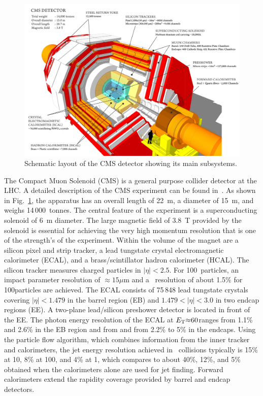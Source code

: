 \begin{figure}
\begin{center}
\includegraphics[height=0.49\textwidth]{introduction_figs/cms_120918_03.png}
\caption{Schematic layout of the CMS detector showing its main subsystems.}
\label{figs:CMSdet}
\end{center}
\end{figure}
The Compact Muon Solenoid (CMS) is a general purpose collider detector at the LHC. A detailed description of the CMS experiment
can be found in~\cite{Chatrchyan:2008zzk}.
As shown in Fig.~\ref{figs:CMSdet},  the apparatus has an overall length of 22~m, a diameter of 15~m, and weighs 14\,000~tonnes.
The central feature of the experiment is a superconducting solenoid
of 6~m diameter. The large magnetic field of 3.8~T provided by the solenoid is essential for achieving
the very high momentum resolution that is one of the strength's of the experiment.
Within the volume of the magnet are a silicon pixel and strip tracker, a lead tungstate crystal
electromagnetic calorimeter (ECAL), and a brass/scintillator hadron calorimeter (HCAL).
The silicon tracker measures charged particles in $|\eta|< 2.5$.
For 100\GeVc\ particles, an impact parameter resolution of $\approx 15\mu$m and a \pT\
resolution of about 1.5\% for 100\GeV [100\GeVc] particles are achieved.
The ECAL consists of 75\,848 lead tungstate crystals covering $|\eta|< 1.479 $ in the
barrel region (EB) and $1.479 < |\eta| < 3.0$ in two endcap regions (EE).
A two-plane lead/silicon preshower detector is located  in front of the EE.
The photon energy resolution of the ECAL at  $E_{\rm T} {\approx} 60$\GeV ranges from
 1.1\% and 2.6\% in the EB region and from and from 2.2\% to 5\% in the
endcaps.
Using the particle flow algorithm, which combines information from the inner tracker
and calorimeters, the jet energy resolution achieved in \pp\ collisions typically
is 15\% at 10\GeV, 8\% at 100\GeV, and 4\% at 1\TeV,
which compares to about 40\%, 12\%, and 5\% obtained when the calorimeters alone
are used for jet finding.
Forward calorimeters extend the rapidity coverage provided by barrel and endcap detectors.

